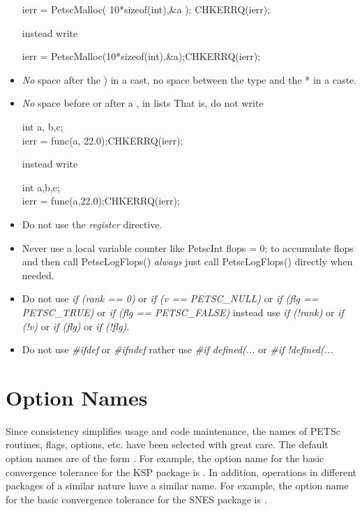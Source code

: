 \documentclass[twoside,12pt]{../sty/report_petsc}
\begin{document}
\begin{itemize}
\begin{tabbing}
   ierr = PetscMalloc( 10*sizeof(int),\&a ); CHKERRQ(ierr);
\end{tabbing}
instead write
\begin{tabbing}
   ierr = PetscMalloc(10*sizeof(int),\&a);CHKERRQ(ierr);
\end{tabbing}
\item {\em No} space after the ) in a cast, no space between the type and the * in a caste.
\item {\em No} space before or after a , in lists
That is, do not write
\begin{tabbing}
    int a, b,c;\\
    ierr = func(a, 22.0);CHKERRQ(ierr);
\end{tabbing}
instead write
\begin{tabbing}
    int a,b,c;\\
    ierr = func(a,22.0);CHKERRQ(ierr);
\end{tabbing}

\item Do not use the {\em register} directive.
\item Never use a local variable counter like PetscInt flops = 0; to accumulate flops and then call PetscLogFlops() {\em always} just
      call PetscLogFlops() directly when needed.
\item Do not use {\em if (rank == 0)} or {\em if (v == PETSC\_NULL)} or {\em if (flg == PETSC\_TRUE)} or {\em if (flg == PETSC\_FALSE)} 
instead use {\em if (!rank)} or {\em if (!v)} or {\em if (flg)} or {\em if (!flg)}.
\item Do not use {\em \#ifdef} or {\em \#ifndef} rather use {\em \#if defined(...} or {\em \#if !defined(...}
\end{itemize}

\section{Option Names}

Since consistency simplifies usage and code maintenance, the names of
PETSc routines, flags, options, etc. have been selected with great care.
The default option names are of the form .  
For example, the option name for the basic convergence tolerance for 
the KSP package is . In addition, operations in different 
packages of a similar nature have a similar name.  For example, the option
name for the basic convergence tolerance for the SNES package is 
. 
\end{document}
